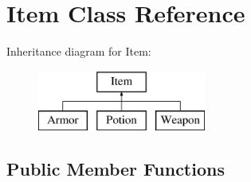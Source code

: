 \hypertarget{class_item}{}\section{Item Class Reference}
\label{class_item}
Inheritance diagram for Item\+:\begin{figure}[H]
\begin{center}
\leavevmode
\includegraphics[height=2.000000cm]{class_item}
\end{center}
\end{figure}
\subsection*{Public Member Functions}
